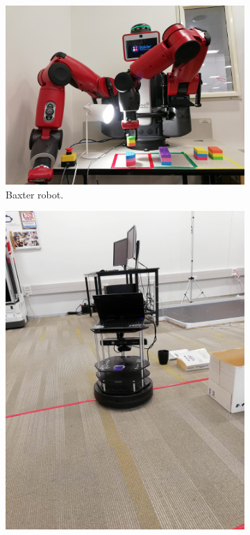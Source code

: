 \documentclass[letterpaper, 10 pt, conference]{article}  %
\begin{document}
\begin{figure}[tb]
  \begin{center}
    \begin{subfigure}{0.23\textwidth}
      \includegraphics[width=\textwidth]{Images/baxter1}
      \caption{Baxter robot.}
      \label{fig:example-baxter}
    \end{subfigure}
    \begin{subfigure}{0.17\textwidth}
      \includegraphics[width=\textwidth]{Images/turtlebot1}

\end{subfigure}
\end{center}
\end{figure}
\end{document}

